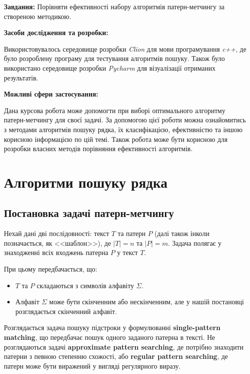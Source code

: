 \documentclass[a4paper,14pt]{extarticle} %
\begin{document}
\textbf{Завдання:} Порівняти ефективності набору алгоритмів патерн-метчингу за створеною методикою.

\textbf{Засоби дослідження та розробки:}

Використовувалось середовище розробки \textit{Clion} для мови програмування \textit{c++}, де було розроблену програму для тестування алгоритмів пошуку. Також було використано середовище розробки \textit{Pycharm} для візуалізації отриманих результатів.

\textbf{Можливі сфери застосування:}

Дана курсова робота може допомогти при виборі оптимального алгоритму патерн-метчингу для своєї задачі. За допомогою цієї роботи можна ознайомитись з методами алгоритмів пошуку рядка, їх класифікацією, ефективністю та іншою корисною інформацією по цій темі.
Також робота може бути корисною для розробки власних методів порівняння ефективності алгоритмів. 

    \newpage



    \section{Алгоритми пошуку рядка}

	\subsection{Постановка задачі патерн-метчингу}

	Нехай дані дві послідовності: текст \( T \) та патерн \( P \) (далі також інколи позначається, як <<шаблон>>), де \( |T| = n \) та \( |P| = m \). Задача полягає у знаходженні всіх входжень патерна \( P \) у текст \( T \).

При цьому передбачається, що:
\begin{itemize}
    \item \( T \) та \( P \) складаються з символів алфавіту \( \Sigma \).
    \item Алфавіт \( \Sigma \) може бути скінченним або нескінченним, але у нашій постановці розглядається скінченний алфавіт.
\end{itemize}


Розглядається задача пошуку підстроки у формулюванні \textbf{single-pattern matching}, що передбачає пошук одного заданого патерна в тексті. Не розглядаються задачі \textbf{approximate pattern searching}, де потрібно знаходити патерни з певною степенню схожості, або \textbf{regular pattern searching}, де патерн може бути виражений у вигляді регулярного виразу.
\end{document}
